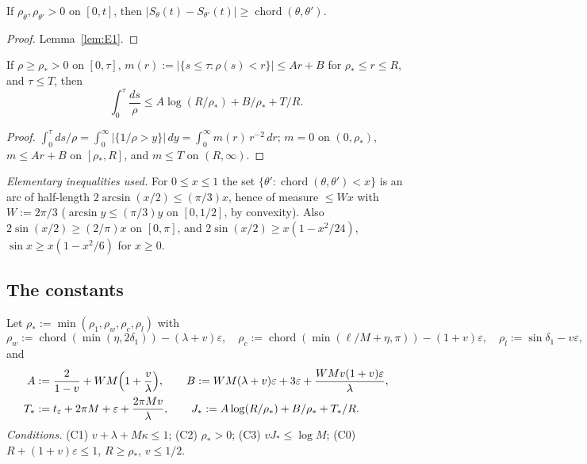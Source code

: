 \begin{lemma}[W4: chords]\label{lem:D3-W4}
If $\rho_\theta,\rho_{\theta'}>0$ on $[0,t]$, then $|S_\theta(t)-S_{\theta'}(t)|\ge\operatorname{chord}(\theta,\theta')$.
\end{lemma}
\begin{proof}
Lemma~\ref{lem:E1}.
\end{proof}

\begin{lemma}\label{lem:D3-W5}
If $\rho\ge\rho_*>0$ on $[0,\tau]$, $m(r):=|\{s\le\tau:\rho(s)<r\}|\le Ar+B$ for $\rho_*\le r\le R$, and $\tau\le T$, then
\[
\int_0^\tau\frac{ds}{\rho}\le A\log(R/\rho_*)+B/\rho_*+T/R.
\]
\end{lemma}
\begin{proof}
$\int_0^\tau ds/\rho=\int_0^\infty|\{1/\rho>y\}|\,dy=\int_0^\infty m(r)\,r^{-2}\,dr$; $m=0$ on $(0,\rho_*)$, $m\le Ar+B$ on
$[\rho_*,R]$, and $m\le T$ on $(R,\infty)$.
\end{proof}

\emph{Elementary inequalities used.} For $0\le x\le1$ the set $\{\theta':\operatorname{chord}(\theta,\theta')<x\}$ is an arc of
half-length $2\arcsin(x/2)\le(\pi/3)x$, hence of measure $\le Wx$ with $W:=2\pi/3$ ($\arcsin y\le(\pi/3)y$ on $[0,1/2]$, by
convexity). Also $2\sin(x/2)\ge(2/\pi)x$ on $[0,\pi]$, and $2\sin(x/2)\ge x(1-x^2/24)$, $\sin x\ge x(1-x^2/6)$ for $x\ge0$.

\subsection{The constants}
Let $\rho_*:=\min(\rho_1,\rho_w,\rho_c,\rho_l)$ with
\[
\rho_w:=\operatorname{chord}(\min(\eta,2\delta_1))-(\lambda+v)\varepsilon,\quad
\rho_c:=\operatorname{chord}(\min(\ell/M+\eta,\pi))-(1+v)\varepsilon,\quad
\rho_l:=\sin\delta_1-v\varepsilon,
\]
and
\begin{align*}
A&:=\frac{2}{1-v}+WM\Bigl(1+\frac v\lambda\Bigr),\qquad
B:=WM(\lambda+v)\varepsilon+3\varepsilon+\frac{WMv(1+v)\varepsilon}{\lambda},\\
T_*&:=t_\varepsilon+2\pi M+\varepsilon+\frac{2\pi Mv}{\lambda},\qquad
J_*:=A\log(R/\rho_*)+B/\rho_*+T_*/R.
\end{align*}
\emph{Conditions.} (C1) $v+\lambda+M\kappa\le1$; (C2) $\rho_*>0$; (C3) $vJ_*\le\log M$; (C0) $R+(1+v)\varepsilon\le1$,
$R\ge\rho_*$, $v\le1/2$.


